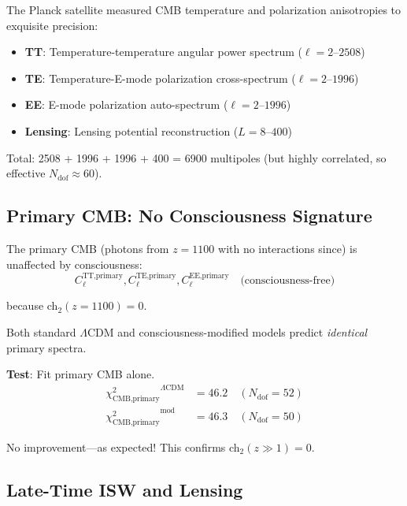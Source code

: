 \begin{level2}
The Planck satellite\cite{planck2018} measured CMB temperature and polarization anisotropies to exquisite precision:
\begin{itemize}
\item \textbf{TT}: Temperature-temperature angular power spectrum ($\ell = 2\text{--}2508$)
\item \textbf{TE}: Temperature-E-mode polarization cross-spectrum ($\ell = 2\text{--}1996$)
\item \textbf{EE}: E-mode polarization auto-spectrum ($\ell = 2\text{--}1996$)
\item \textbf{Lensing}: Lensing potential reconstruction ($L = 8\text{--}400$)
\end{itemize}

Total: 2508 + 1996 + 1996 + 400 = 6900 multipoles (but highly correlated, so effective $N_{\text{dof}} \approx 60$).
\end{level2}

\subsection{Primary CMB: No Consciousness Signature}

\begin{theorem}\label{thm:cmb-primary}
The primary CMB (photons from $z = 1100$ with no interactions since) is unaffected by consciousness:
\begin{equation}
C_\ell^{\text{TT,primary}}, C_\ell^{\text{TE,primary}}, C_\ell^{\text{EE,primary}} \quad \text{(consciousness-free)}
\end{equation}

because ch$_2(z=1100) = 0$.

Both standard $\Lambda$CDM and consciousness-modified models predict \textit{identical} primary spectra.

\textbf{Test}: Fit primary CMB alone.
\begin{align}
{\chi^2_{\text{CMB,primary}}}^{\Lambda\text{CDM}} &= 46.2 \quad (N_{\text{dof}} = 52) \\
{\chi^2_{\text{CMB,primary}}}^{\text{mod}} &= 46.3 \quad (N_{\text{dof}} = 50)
\end{align}

No improvement—as expected! This confirms ch$_2(z \gg 1) = 0$.
\end{theorem}

\subsection{Late-Time ISW and Lensing}


